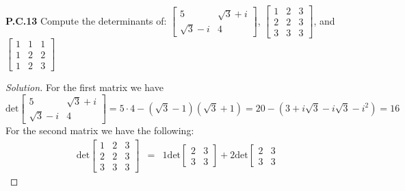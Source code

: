 \documentclass[12pt]{amsart}
\newenvironment{solution}
{\begin{proof}[Solution]}
{\end{proof}}
\begin{document}
\begin{onehalfspace}
        \noindent\textbf{P.C.13} Compute the determinants of:
        $\begin{bmatrix}
             5 & \sqrt{3} + i \\
             \sqrt{3} - i & 4
        \end{bmatrix}$,
        $\begin{bmatrix}
             1 & 2 & 3 \\
             2 & 2 & 3 \\
             3 & 3 & 3
        \end{bmatrix}$, and
        $\begin{bmatrix}
             1 & 1 & 1 \\
             1 & 2 & 2 \\
             1 & 2 & 3
        \end{bmatrix}$
        \begin{solution}
            For the first matrix we have
            \begin{displaymath}
                \text{det}\left[
                  \begin{matrix}
                      5 & \sqrt{3} + i \\
                      \sqrt{3} - i & 4
                  \end{matrix}
                \right]
                = 5\cdot4 - (\sqrt{3}-1)(\sqrt{3} + 1) = 20 - (3 + i\sqrt{3} - i\sqrt{3} - i^2) = 16
            \end{displaymath}
            For the second matrix we have the following:
            \begin{eqnarray*}
                \text{det}\left[
                   \begin{matrix}
                       1 & 2 & 3 \\
                       2 & 2 & 3 \\
                       3 & 3 & 3
                   \end{matrix}
                \right]
                 & = & 1\text{det}\left[
                    \begin{matrix}
                        2 & 3 \\
                        3 & 3
                    \end{matrix}
                \right] +
                2\text{det}\left[
                   \begin{matrix}
                       2 & 3 \\
                       3 & 3

\end{matrix}
\end{eqnarray*}
\end{solution}
\end{onehalfspace}
\end{document}
